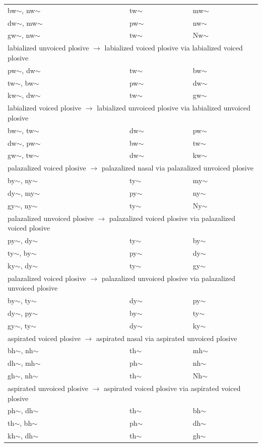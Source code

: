 \documentclass[11pt]{article}
\begin{document}
\begin{table}[h]
\begin{tabular}{ l | l | l }
bw$\sim$, nw$\sim$ & tw$\sim$ & mw$\sim$ \\
dw$\sim$, mw$\sim$ & pw$\sim$ & nw$\sim$ \\
gw$\sim$, nw$\sim$ & tw$\sim$ & Nw$\sim$ \\
 \hline \multicolumn{3}{l}{labialized unvoiced plosive $\rightarrow$ labialized voiced plosive via labialized voiced plosive}\\  \hline
pw$\sim$, dw$\sim$ & tw$\sim$ & bw$\sim$ \\
tw$\sim$, bw$\sim$ & pw$\sim$ & dw$\sim$ \\
kw$\sim$, dw$\sim$ & tw$\sim$ & gw$\sim$ \\
 \hline \multicolumn{3}{l}{labialized voiced plosive $\rightarrow$ labialized unvoiced plosive via labialized unvoiced plosive}\\  \hline
bw$\sim$, tw$\sim$ & dw$\sim$ & pw$\sim$ \\
dw$\sim$, pw$\sim$ & bw$\sim$ & tw$\sim$ \\
gw$\sim$, tw$\sim$ & dw$\sim$ & kw$\sim$ \\
 \hline \multicolumn{3}{l}{palazalized voiced plosive $\rightarrow$  palazalized nasal via palazalized unvoiced plosive}\\  \hline
by$\sim$, ny$\sim$ & ty$\sim$ & my$\sim$ \\
dy$\sim$, my$\sim$ & py$\sim$ & ny$\sim$ \\
gy$\sim$, ny$\sim$ & ty$\sim$ & Ny$\sim$ \\
 \hline \multicolumn{3}{l}{palazalized unvoiced plosive $\rightarrow$ palazalized voiced plosive via palazalized voiced plosive}\\  \hline
py$\sim$, dy$\sim$ & ty$\sim$ & by$\sim$ \\
ty$\sim$, by$\sim$ & py$\sim$ & dy$\sim$ \\
ky$\sim$, dy$\sim$ & ty$\sim$ & gy$\sim$ \\
 \hline \multicolumn{3}{l}{palazalized voiced plosive $\rightarrow$ palazalized unvoiced plosive via palazalized unvoiced plosive}\\  \hline
by$\sim$, ty$\sim$ & dy$\sim$ & py$\sim$ \\
dy$\sim$, py$\sim$ & by$\sim$ & ty$\sim$ \\
gy$\sim$, ty$\sim$ & dy$\sim$ & ky$\sim$ \\
 \hline \multicolumn{3}{l}{aspirated voiced plosive $\rightarrow$  aspirated nasal via aspirated unvoiced plosive}\\  \hline
bh$\sim$, nh$\sim$ & th$\sim$ & mh$\sim$ \\
dh$\sim$, mh$\sim$ & ph$\sim$ & nh$\sim$ \\
gh$\sim$, nh$\sim$ & th$\sim$ & Nh$\sim$ \\
 \hline \multicolumn{3}{l}{aspirated unvoiced plosive $\rightarrow$ aspirated voiced plosive via aspirated voiced plosive}\\  \hline
ph$\sim$, dh$\sim$ & th$\sim$ & bh$\sim$ \\
th$\sim$, bh$\sim$ & ph$\sim$ & dh$\sim$ \\
kh$\sim$, dh$\sim$ & th$\sim$ & gh$\sim$ \\


\end{tabular}
\end{table}
\end{document}
